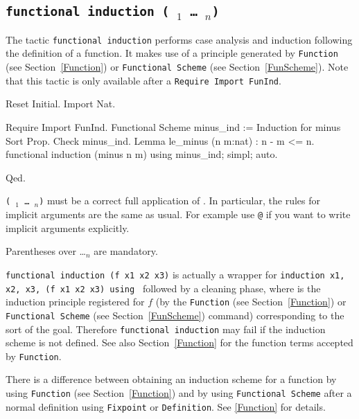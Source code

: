 \begin{coq_example*}
\subsection{\tt functional induction (\qualid\ \term$_1$ \dots\ \term$_n$)}
\label{FunInduction}

The tactic \texttt{functional induction} performs
case analysis and induction following the definition of a function. It
makes use of a principle generated by \texttt{Function}
(see Section~\ref{Function}) or \texttt{Functional Scheme}
(see Section~\ref{FunScheme}). Note that this tactic is only available
after a {\tt Require Import FunInd}.

\begin{coq_eval}
Reset Initial.
Import Nat.
\end{coq_eval}
\begin{coq_example}
Require Import FunInd.
Functional Scheme minus_ind := Induction for minus Sort Prop.
Check minus_ind.
Lemma le_minus (n m:nat) : n - m <= n.
functional induction (minus n m) using minus_ind; simpl; auto.
\end{coq_example}
\begin{coq_example*}
Qed.
\end{coq_example*}

\Rem \texttt{(\qualid\ \term$_1$ \dots\ \term$_n$)} must be a correct
full application of \qualid. In particular, the rules for implicit
arguments are the same as usual. For example use \texttt{@\qualid} if
you want to write implicit arguments explicitly.

\Rem Parentheses over \qualid \dots \term$_n$ are mandatory.

\Rem \texttt{functional induction (f x1 x2 x3)} is actually a wrapper
for \texttt{induction x1, x2, x3, (f x1 x2 x3) using \qualid} followed by
a cleaning phase, where {\qualid} is the induction principle
registered for $f$ (by the \texttt{Function} (see Section~\ref{Function})
or \texttt{Functional Scheme} (see Section~\ref{FunScheme}) command)
corresponding to the sort of the goal.  Therefore \texttt{functional
  induction} may fail if the induction scheme {\qualid} is
not defined. See also Section~\ref{Function} for the function terms
accepted by \texttt{Function}.

\Rem There is a difference between obtaining an induction scheme for a
function by using \texttt{Function} (see Section~\ref{Function}) and by
using \texttt{Functional Scheme} after a normal definition using
\texttt{Fixpoint} or \texttt{Definition}. See \ref{Function} for
details.


\end{coq_example*}

